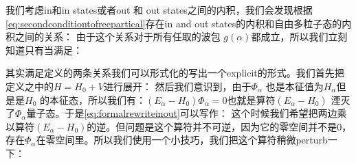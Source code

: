 
我们考虑in和in states或者out 和 out states之间的内积，我们会发现根据\cref{eq:secondconditiontofreepartical}存在in and out states的内积和自由多粒子态的内积之间的关系：
由于这个关系对于所有任取的波包 $ g(\alpha) $都成立，所以我们立刻知道只有当满足：


其实满足定义的两条关系我们可以形式化的写出一个explicit的形式。我们首先把定义之中的$ H = H_0+V $进行展开：
然后我们意识到，由于$ \Phi_\alpha $ 也是本征值为$ H_\alpha $但是是$ H_0 $ 的本征态，所以我们有：$( E_\alpha-H_0 )\Phi_\alpha = 0 $也就是算符$ ( E_\alpha-H_0 ) $ 湮灭了$ \Phi_\alpha $量子态。于是\cref{eq:formalrewriteinout}可以写作：
这个时候我们希望把两边乘以算符$ (E_\alpha-H_0) $的逆。但问题是这个算符并不可逆，因为它的零空间并不是0，存在$ \Phi_\alpha $在零空间里。所以我们使用一个小技巧，我们把这个算符稍微perturb一下：   